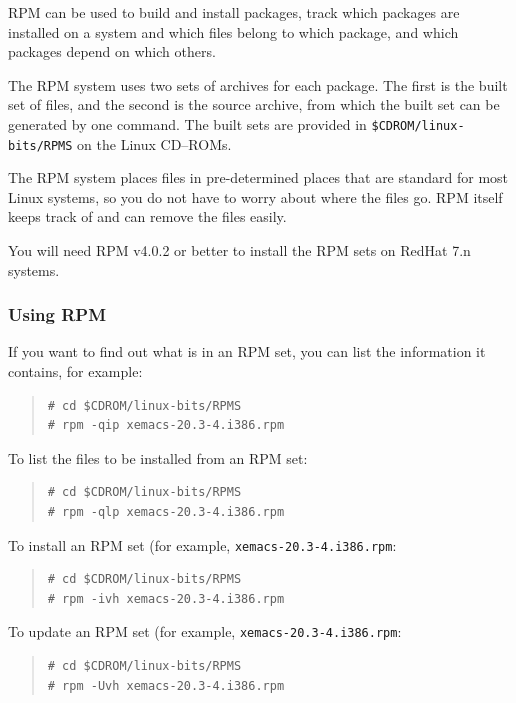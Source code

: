 \documentclass[twoside,11pt]{article}
\renewcommand{\_}{\texttt{\symbol{95}}}
\newcommand{\cdroms}{CD--ROMs}
\newcommand{\cdroms}{CD-ROMs}
\begin{document}
RPM can be used to build and install packages, track which packages are
installed on a system and which files belong to which package, and which
packages depend on which others.

The RPM system uses two sets of archives for each package.  The first
is the built set of files, and the second is the source archive, from
which the built set can be generated by one command.  The built sets
are provided in \texttt{\$CDROM/linux-bits/RPMS} on the Linux
\cdroms.

The RPM system places files in pre-determined places that are standard for 
most Linux systems, so you do not have to worry about where the files go.
RPM itself keeps track of and can remove the files easily.

You will need RPM v4.0.2 or better to install the RPM sets on RedHat 7.n
systems.

\subsubsection{Using RPM}

If you want to find out what is in an RPM set, you can list the information
it contains, for example:

\begin{quote}
\begin{verbatim}
# cd $CDROM/linux-bits/RPMS
# rpm -qip xemacs-20.3-4.i386.rpm
\end{verbatim}
\end{quote}

To list the files to be installed from an RPM set:

\begin{quote}
\begin{verbatim}
# cd $CDROM/linux-bits/RPMS
# rpm -qlp xemacs-20.3-4.i386.rpm
\end{verbatim}
\end{quote}

To install an RPM set (for example, \texttt{xemacs-20.3-4.i386.rpm}:

\begin{quote}
\begin{verbatim}
# cd $CDROM/linux-bits/RPMS
# rpm -ivh xemacs-20.3-4.i386.rpm
\end{verbatim}
\end{quote}

To update an RPM set (for example, \texttt{xemacs-20.3-4.i386.rpm}:

\begin{quote}
\begin{verbatim}
# cd $CDROM/linux-bits/RPMS
# rpm -Uvh xemacs-20.3-4.i386.rpm
\end{verbatim}
\end{quote}
\end{document}
